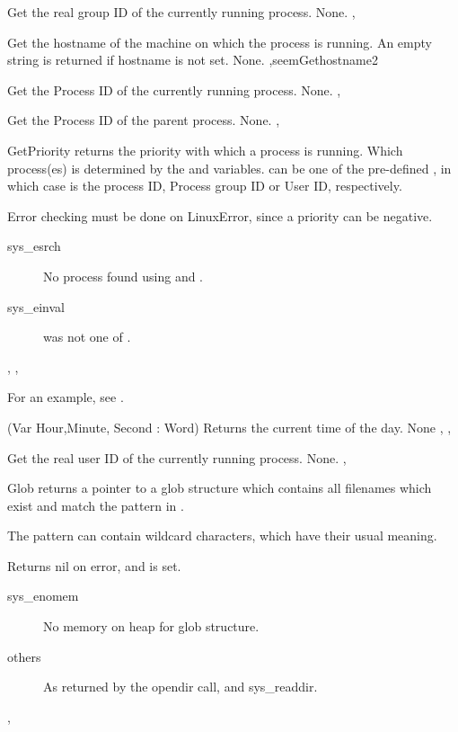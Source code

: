 

{ Get the real group ID of the currently running process.}
{None.}
{,  }


{
Get the hostname of the machine on which the process is running.
An empty string is returned if hostname is not set.
}
{None.}
{ ,seem{Gethostname}{2} }



{ Get the Process ID of the currently running process.}
{None.}
{, }




{ Get the Process ID of the parent process.}
{None.}
{, }



{
GetPriority returns the priority with which a process is running.
Which process(es) is determined by the  and  variables.
 can be one of the pre-defined , in which case  is the process ID, Process group ID or
User ID, respectively.
}
{
 Error checking must be done on LinuxError, since a priority can be negative.
 \begin{description}
 \item[sys\_esrch] No process found using  and .
 \item[sys\_einval]  was not one of .
 \end{description}
 }
{, , }

For an example, see .

{ (Var Hour,Minute, Second : Word) }
{
Returns the current time of the day.
}
{None}
{, ,  }



{ Get the real user ID of the currently running process.}
{None.}
{,  }



{
Glob returns a pointer to a glob structure which contains all filenames which
exist and match the pattern in .

The pattern can contain wildcard characters, which have their
usual meaning.
}
{ Returns nil on error, and  is set.
\begin{description}
\item[sys\_enomem] No memory on heap for glob structure.
\item[others] As returned by the opendir call, and sys\_readdir.
\end{description}
}
{,  }

